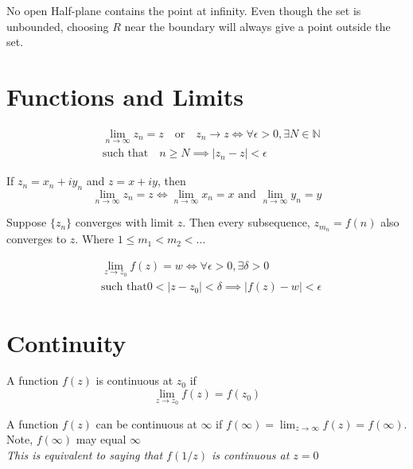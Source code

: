 \begin{example}
    No open Half-plane contains the point at infinity. Even though the set is unbounded, choosing $R$ near the boundary will always give a point outside the set.
\end{example}

\section{Functions and Limits}

\begin{definition}
    \begin{align}
         & \lim_{n \to \infty} z_n = z \quad \text{or}\quad z_n \to z \iff \forall \epsilon > 0, \exists N \in \mathbb{N} \\
         & \text{such that} \quad n \geq N \implies |z_n - z| < \epsilon
    \end{align}
\end{definition}

\begin{corollary}
    If $z_n = x_n + iy_n$ and $z = x + iy$, then
    \[
        \lim_{n \to \infty} z_n = z \iff \lim_{n \to \infty} x_n = x \text{ and } \lim_{n \to \infty} y_n = y
    \]
\end{corollary}

\begin{theorem}
    [Subsequence]
    Suppose $\{z_n\}$ converges with limit $z$. Then every subsequence, $z_{m_n} = f(n)$ also converges to $z$. Where $ 1 \leq m_1 < m_2 < \ldots$
\end{theorem}

\begin{definition}
    \begin{align}
         & \lim_{z \to z_0} f(z) = w \iff \forall \epsilon > 0, \exists \delta > 0 \\
         & \text{such that} 0 < |z - z_0| < \delta \implies |f(z) - w| < \epsilon
    \end{align}
\end{definition}

\section{Continuity}
\begin{definition}
    A function $f(z)$ is continuous at $z_0$ if
    \[
        \lim_{z \to z_0} f(z) = f(z_0)
    \]
\end{definition}

\begin{corollary}
    A function $f(z)$ can be continuous at $\infty$ if $f(\infty) = \lim_{z\to \infty}f(z) = f(\infty)$. Note, $f(\infty)$ may equal $\infty$ \\
    \textit{This is equivalent to saying that $f(1/z)$ is continuous at $z = 0$}
\end{corollary}